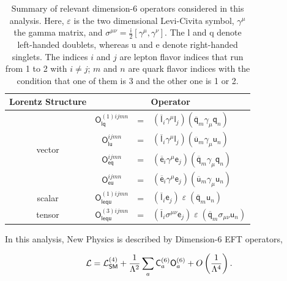 \begin{table}[t]
\sffamily
\centering
\caption{Summary of relevant dimension-6 operators considered in this analysis. Here, $\varepsilon$ is the two dimensional Levi-Civita symbol, $\gamma^\mu$ the gamma matrix, and $\sigma^{\mu\nu}=\frac{\textsf{i}}{2}[\gamma^\mu,\gamma^\nu]$. The l and q denote left-handed doublets, whereas u and e denote right-handed singlets. The indices $i$ and $j$ are lepton flavor indices that run from 1 to 2 with $i \neq j$; $m$ and $n$ are quark flavor indices with the condition that one of them is 3 and the other one is 1 or 2.}
\begin{tabular}{cccl}
\toprule
Lorentz Structure & \multicolumn{3}{c}{Operator}\\
\midrule
\multirow{4}{*}{vector} & $\textsf{O}_{\textsf{lq}}^{(1)ijmn}$ &=& $(\overline{\textsf{l}}_i\gamma^\mu\textsf{l}_j)
  (\overline{\textsf{q}}_m\gamma_\mu\textsf{q}_n)$
  \\
 & $\textsf{O}_{\textsf{lu}}^{ijmn}$ &=& $(\overline{\textsf{l}}_i\gamma^\mu\textsf{l}_j)
  (\overline{\textsf{u}}_m\gamma_\mu\textsf{u}_n)$
  \\  
 & $\textsf{O}_{\textsf{eq}}^{ijmn}$ &=& $(\overline{\textsf{e}}_i\gamma^\mu\textsf{e}_j)
  (\overline{\textsf{q}}_m\gamma_\mu\textsf{q}_n)$
  \\ 
 & $\textsf{O}_{\textsf{eu}}^{ijmn}$ &=& $(\overline{\textsf{e}}_i\gamma^\mu\textsf{e}_j)
  (\overline{\textsf{u}}_m\gamma_\mu\textsf{u}_n)$
  \\ \midrule
\multirow{1}{*}{scalar} & $\textsf{O}_{\textsf{lequ}}^{(1)ijmn}$ &=& $(\overline{\textsf{l}}_i\textsf{e}_j)\;\varepsilon\;
  (\overline{\textsf{q}}_m\textsf{u}_n)$
  \\ 
 \multirow{1}{*}{tensor} & $\textsf{O}_{\textsf{lequ}}^{(3)ijmn}$ &=& $(\overline{\textsf{l}}_i \sigma^{\mu\nu}\textsf{e}_j)\;\varepsilon\;
  (\overline{\textsf{q}}_m\sigma_{\mu\nu}\textsf{u}_n)$
 \\ \bottomrule
\end{tabular}
\label{tab:dimension6}
\end{table}

In this analysis, New Physics is described by Dimension-6 \ac{EFT} operators,

\begin{equation}
\label{eq:0}
\mathcal{L}=\mathcal{L}_{\textsf{SM}}^{(4)} + \frac{1}{\mathrm{\Lambda}^2}\sum_{a}\textsf{C}^{(6)}_{a}\textsf{O}^{(6)}_{a}+O\left( \frac{1}{\mathrm{\Lambda}^4}\right).
\end{equation}  

